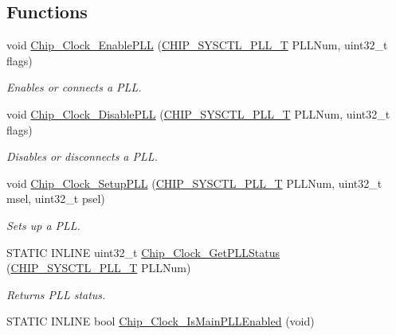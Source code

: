 \subsection*{Functions}
\begin{DoxyCompactItemize}
\item 
void \hyperlink{group___c_l_o_c_k__17_x_x__40_x_x_ga2f3b19dee294433937973fb4fedfe3f6}{Chip\+\_\+\+Clock\+\_\+\+Enable\+P\+L\+L} (\hyperlink{group___s_y_s_c_t_l__17_x_x__40_x_x_ga5f5478a201b021ed04a0724bff524c4b}{C\+H\+I\+P\+\_\+\+S\+Y\+S\+C\+T\+L\+\_\+\+P\+L\+L\+\_\+\+T} P\+L\+L\+Num, uint32\+\_\+t flags)
\begin{DoxyCompactList}\small\item\em Enables or connects a P\+L\+L. \end{DoxyCompactList}\item 
void \hyperlink{group___c_l_o_c_k__17_x_x__40_x_x_ga3b9589b6a14d39653503be3693990f8f}{Chip\+\_\+\+Clock\+\_\+\+Disable\+P\+L\+L} (\hyperlink{group___s_y_s_c_t_l__17_x_x__40_x_x_ga5f5478a201b021ed04a0724bff524c4b}{C\+H\+I\+P\+\_\+\+S\+Y\+S\+C\+T\+L\+\_\+\+P\+L\+L\+\_\+\+T} P\+L\+L\+Num, uint32\+\_\+t flags)
\begin{DoxyCompactList}\small\item\em Disables or disconnects a P\+L\+L. \end{DoxyCompactList}\item 
void \hyperlink{group___c_l_o_c_k__17_x_x__40_x_x_gaf4a2dd4c6aae5d6b830f7cf529ec8773}{Chip\+\_\+\+Clock\+\_\+\+Setup\+P\+L\+L} (\hyperlink{group___s_y_s_c_t_l__17_x_x__40_x_x_ga5f5478a201b021ed04a0724bff524c4b}{C\+H\+I\+P\+\_\+\+S\+Y\+S\+C\+T\+L\+\_\+\+P\+L\+L\+\_\+\+T} P\+L\+L\+Num, uint32\+\_\+t msel, uint32\+\_\+t psel)
\begin{DoxyCompactList}\small\item\em Sets up a P\+L\+L. \end{DoxyCompactList}\item 
S\+T\+A\+T\+I\+C I\+N\+L\+I\+N\+E uint32\+\_\+t \hyperlink{group___c_l_o_c_k__17_x_x__40_x_x_ga30a134e114a19fdf625326f8258e4652}{Chip\+\_\+\+Clock\+\_\+\+Get\+P\+L\+L\+Status} (\hyperlink{group___s_y_s_c_t_l__17_x_x__40_x_x_ga5f5478a201b021ed04a0724bff524c4b}{C\+H\+I\+P\+\_\+\+S\+Y\+S\+C\+T\+L\+\_\+\+P\+L\+L\+\_\+\+T} P\+L\+L\+Num)
\begin{DoxyCompactList}\small\item\em Returns P\+L\+L status. \end{DoxyCompactList}\item 
S\+T\+A\+T\+I\+C I\+N\+L\+I\+N\+E bool \hyperlink{group___c_l_o_c_k__17_x_x__40_x_x_ga63e9e5918d1a8b0d1c5811c3f0189846}{Chip\+\_\+\+Clock\+\_\+\+Is\+Main\+P\+L\+L\+Enabled} (void)

\end{DoxyCompactItemize}
